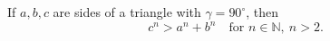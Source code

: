 If $a, b, c$ are sides of a triangle with $\gamma = 90^\circ$, then
\[ c^n > a^n + b^n \quad\text{for } n \in \mathbb{N},\ n > 2. \]
